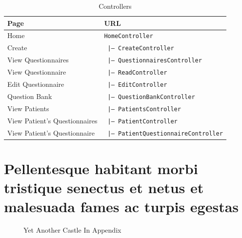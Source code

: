 \documentclass{higrep}
\def\code#1{\texttt{#1}}
\begin{document}
\begin{table}[htbp]
  \centering
  \footnotesize\sffamily
  \begin{tabular}{|| l | l ||}
    \hline\hline
    \textbf{Page}  &  \textbf{URL}\\
    \hline
    Home  & \code{HomeController}  \\
    Create  & \code{ |--- CreateController}  \\
    View Questionnaires  & \code{ |--- QuestionnairesController}  \\
    View Questionnaire  & \code{ \hspace{.5cm} |--- ReadController}  \\
    Edit Questionnaire  & \code{ \hspace{.5cm} |--- EditController}  \\
    Question Bank  & \code{ |--- QuestionBankController}  \\
    View Patients  & \code{ |--- PatientsController}  \\
    View Patient's Questionnaires  & \code{ \hspace{.5cm}	|--- PatientController}  \\
    View Patient's Questionnaire  & \code{ \hspace{1.4cm}|--- PatientQuestionnaireController}  \\
    \hline\hline
  \end{tabular}
  \caption{Controllers} \label{Tab:Controllers}
\end{table}

\newpage
\chapter{Pellentesque habitant
  morbi tristique senectus et netus et malesuada fames ac turpis
  egestas}

\begin{figure}
  \centering
  \caption{Yet Another Castle In Appendix} \label{Fig:castle2}
\end{figure}
\end{document}
